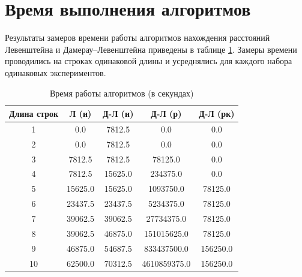 \clearpage

\section{Время выполнения алгоритмов}

Результаты замеров времени работы алгоритмов нахождения расстояний
Левенштейна и Дамерау–Левенштейна приведены в таблице \ref{tbl:time_measurements}. Замеры времени проводились на строках одинаковой длины и усреднялись для каждого набора одинаковых экспериментов.

\begin{table}[h]
	\begin{center}
		\begin{threeparttable}
			\captionsetup{justification=raggedright,singlelinecheck=off}
			\caption{Время работы алгоритмов (в секундах)}
			\label{tbl:time_measurements}
			\begin{tabular}{|c|c|c|c|c|}
				\hline
				Длина строк &  Л (и)  & Д-Л (и) & Д-Л (р) & Д-Л (рк) \\
				\hline
			1 & 0.0 & 7812.5 & 0.0 & 0.0 \\
			\hline
			2 & 0.0 & 7812.5 & 0.0 & 0.0 \\
			\hline
			3 & 7812.5 & 7812.5 & 78125.0 & 0.0 \\
			\hline
			4 & 7812.5 & 15625.0 & 234375.0 & 0.0 \\
			\hline
			5 & 15625.0 & 15625.0 & 1093750.0 & 78125.0 \\
			\hline
			6 & 23437.5 & 23437.5 & 5234375.0 & 78125.0 \\
			\hline
			7 & 39062.5 & 39062.5 & 27734375.0 & 78125.0 \\
			\hline
			8 & 39062.5 & 46875.0 & 151015625.0 & 78125.0 \\
			\hline
			9 & 46875.0 & 54687.5 & 833437500.0 & 156250.0 \\
			\hline
			10 & 62500.0 & 70312.5 & 4610859375.0 & 156250.0 \\
			\hline
			
				
			\end{tabular}
		\end{threeparttable}
	\end{center}
\end{table}

